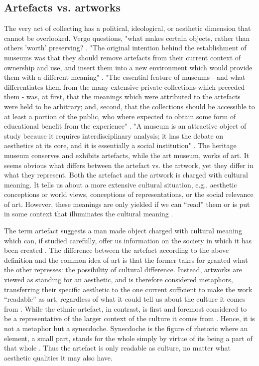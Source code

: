 \subsection{Artefacts vs. artworks}
The very act of collecting has a political, ideological, or aesthetic dimension that cannot be overlooked. Vergo questions, "what makes certain objects, rather than others 'worth' preserving? \autocite[p. 2]{vergo_museology_1989}. "The original intention behind the establishment of museums was that they should remove artefacts from their current context of ownership and use, and insert them into a new environment which would provide them with a different meaning" \autocite[p. 6]{vergo_museology_1989}. "The essential feature of museums - and what differentiates them from the many extensive private collections which preceded them - was, at first, that the meanings which were attributed to the artefacts were held to be arbitrary; and, second, that the collections should be accessible to at least a portion of the public, who where expected to obtain some form of educational benefit from the experience" \autocite[p. 6]{vergo_museology_1989}. "A museum is an attractive object of study because it requires interdisciplinary analysis; it has the debate on aesthetics at its core, and it is essentially a social institution" \autocite[p. 202]{Thi_book}. The heritage museum conserves and exhibits artefacts, while the art museum, works of art. It seems obvious what differs between the artefact vs. the artwork, yet they differ in what they represent. Both the artefact and the artwork is charged with cultural meaning. It tells us about a more extensive cultural situation, e.g., aesthetic conceptions or world views, conceptions of representations, or the social relevance of art. However, these meanings are only yielded if we can “read” them or is put in some context that illuminates the cultural meaning \autocite[p. 206]{Thi_book}.

The term artefact suggests a man made object charged with cultural meaning which can, if studied carefully, offer us information on the society in which it has been created \autocite[p. 205]{Thi_book}. The difference between the artefact according to the above definition and the common idea of art is that the former takes for granted what the other represses: the possibility of cultural difference. Instead, artworks are viewed as standing for an aesthetic, and is therefore considered metaphors, transferring their specific aesthetic to the one current sufficient to make the work “readable” as art, regardless of what it could tell us about the culture it comes from \autocite[p. 206]{Thi_book}. While the ethnic artefact, in contrast, is first and foremost considered to be a representative of the larger context of the culture it comes from \autocite[p. 206]{Thi_book}. Hence, it is not a metaphor but a synecdoche. Synecdoche is the figure of rhetoric where an element, a small part, stands for the whole simply by virtue of its being a part of that whole \autocite[p. 206]{Thi_book}. Thus the artefact is only readable as culture, no matter what aesthetic qualities it may also have.

